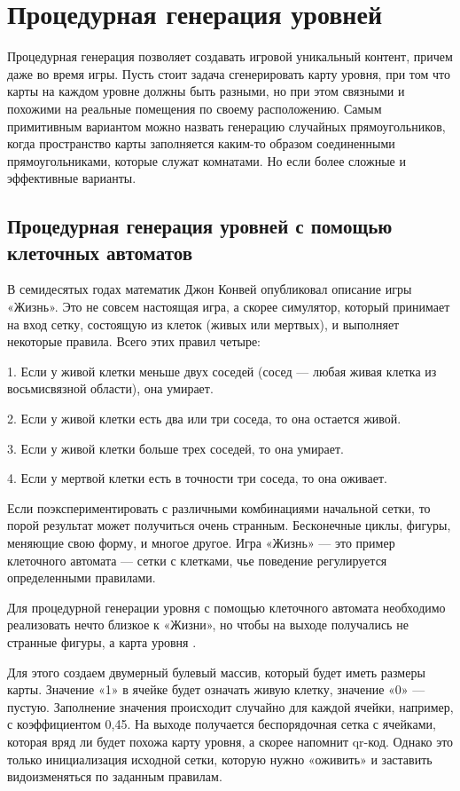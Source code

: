 \documentclass[a4paper,12pt]{report}
\theoremstyle{remark}
\begin{document}
\chapter{Процедурная генерация уровней}

\parindent=1cm
Процедурная генерация позволяет создавать игровой уникальный контент, причем даже во время игры. Пусть стоит задача сгенерировать карту уровня, при том что карты на каждом уровне должны быть разными, но при этом связными и похожими на реальные помещения по своему расположению. Самым примитивным вариантом можно назвать генерацию случайных прямоугольников, когда пространство карты заполняется каким-то образом соединенными прямоугольниками, которые служат комнатами. Но если более сложные и эффективные варианты.

\section{Процедурная генерация уровней с помощью клеточных автоматов}

В семидесятых годах математик Джон Конвей опубликовал описание игры «Жизнь». Это не совсем настоящая игра, а скорее симулятор, который принимает на вход сетку, состоящую из клеток (живых или мертвых), и выполняет некоторые правила. Всего этих правил четыре:

1. Если у живой клетки меньше двух соседей (сосед — любая живая клетка из восьмисвязной области), она умирает.

2. Если у живой клетки есть два или три соседа, то она остается живой.

3. Если у живой клетки больше трех соседей, то она умирает.

4. Если у мертвой клетки есть в точности три соседа, то она оживает.

Если поэкспериментировать с различными комбинациями начальной сетки, то порой результат может получиться очень странным. Бесконечные циклы, фигуры, меняющие свою форму, и многое другое. Игра «Жизнь» — это пример клеточного автомата — сетки с клетками, чье поведение регулируется определенными правилами.

Для процедурной генерации уровня с помощью клеточного автомата необходимо реализовать нечто близкое к «Жизни», но чтобы на выходе получались не странные фигуры, а карта уровня \citep{cellar}.

Для этого создаем двумерный булевый массив, который будет иметь размеры карты. Значение «1» в ячейке будет означать живую клетку, значение «0»  — пустую. Заполнение значения происходит случайно для каждой ячейки, например, с коэффициентом 0,45. На выходе получается беспорядочная сетка с ячейками, которая вряд ли будет похожа карту уровня, а скорее напомнит qr-код. Однако это только инициализация исходной сетки, которую нужно «оживить» и заставить видоизменяться по заданным правилам.
\end{document}
